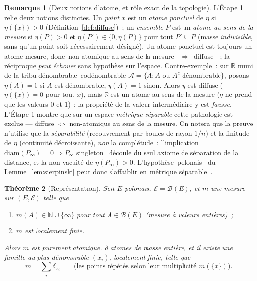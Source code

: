 \documentclass[11pt,a4paper]{article}
\providecommand{\og}{\guillemotleft\,}\providecommand{\fg}{\,\guillemotright}
\theoremstyle{plain}
\newtheorem{theoreme}{Théorème}[section]
\theoremstyle{definition}
\newtheorem{remarque}[theoreme]{Remarque}
\newcommand{\R}{\mathbb{R}}
\newcommand{\N}{\mathbb{N}}
\newcommand{\calE}{\mathcal{E}}
\newcommand{\calB}{\mathcal{B}}
\newcommand{\calA}{\mathcal{A}}
\begin{document}
\begin{remarque}[Deux notions d'atome, et rôle exact de la topologie]\label{rem:deux-atomes}
L'Étape 1 relie deux notions distinctes. Un \emph{point} $x$ est un \emph{atome ponctuel} de $\eta$ si $\eta(\{x\})>0$ (Définition~\ref{def:diffuse})~; un \emph{ensemble} $P$ est un \emph{atome au sens de la mesure} si $\eta(P)>0$ et $\eta(P')\in\{0,\eta(P)\}$ pour tout $P'\subseteq P$ (masse \emph{indivisible}, sans qu'un point soit nécessairement désigné). Un atome ponctuel est toujours un atome-mesure, donc \og non-atomique au sens de la mesure \fg{} $\Rightarrow$ \og diffuse \fg{}~; la réciproque \emph{peut échouer} sans hypothèse sur l'espace. Contre-exemple~: sur $\R$ muni de la tribu dénombrable--codénombrable $\calA=\{A:A\text{ ou }A^c\text{ dénombrable}\}$, posons $\eta(A)=0$ si $A$ est dénombrable, $\eta(A)=1$ sinon. Alors $\eta$ est diffuse ($\eta(\{x\})=0$ pour tout $x$), mais $\R$ est un atome au sens de la mesure ($\eta$ ne prend que les valeurs $0$ et $1$)~: la propriété de la valeur intermédiaire y est \emph{fausse}. L'Étape 1 montre que sur un espace \emph{métrique séparable} cette pathologie est exclue --- diffuse $\Leftrightarrow$ non-atomique au sens de la mesure. On notera que la preuve n'utilise que la \emph{séparabilité} (recouvrement par boules de rayon $1/n$) et la finitude de $\eta$ (continuité décroissante), \emph{non} la complétude~: l'implication \og $\mathrm{diam}(P_\infty)=0\Rightarrow P_\infty$ singleton \fg{} découle du seul axiome de séparation de la distance, et la non-vacuité de $\eta(P_\infty)>0$. L'hypothèse \og polonais \fg{} du Lemme~\ref{lem:sierpinski} peut donc s'affaiblir en \og métrique séparable \fg{}.
\end{remarque}

\begin{theoreme}[Représentation]\label{thm:representation}
Soit $E$ polonais, $\calE=\calB(E)$, et $m$ une mesure sur $(E,\calE)$ telle que
\begin{enumerate}[label=\textup{(\roman*)}]
\item $m(A)\in\N\cup\{\infty\}$ pour tout $A\in\calB(E)$ \textup{(mesure à valeurs entières)}~;
\item $m$ est localement finie.
\end{enumerate}
Alors $m$ est purement atomique, à atomes de masse entière, et il existe une famille au plus dénombrable $(x_i)$, localement finie, telle que
\[
m=\sum_i \delta_{x_i}
\qquad\text{(les points répétés selon leur multiplicité $m(\{x\})$).}
\]
\end{theoreme}
\end{document}
